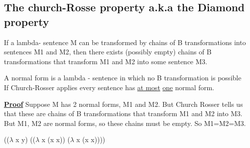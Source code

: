 \documentclass{article}
\begin{document}
\begin{flushleft}
\begin{flushleft}
\subsection*{The church-Rosse property a.k.a the Diamond property}
\begin{flushleft}
If a lambda- sentence M can be transformed by chains of B transformations into sentences M1 and M2, then there exists (possibly empty) chains of B transformations that transform M1 and M2 into some sentence M3.
\end{flushleft}
\begin{flushleft}
A normal form is a lambda - sentence in which no B transformation is possible \\
If Church-Rosser applies every sentence has \underline{at most} \underline{one} normal form.
\end{flushleft}
\begin{flushleft}
\textbf{\underline{Proof}} Suppose M has 2 normal forms, M1 and M2. But Church Rosser tells us that these are chains of B      transformations that transform M1 and M2 into M3. But M1, M2 are normal forms, so these chains must be empty. So M1=M2=M3.
\end{flushleft}
\begin{flushleft}
(($\lambda$ x y) (($\lambda$ x (x x)) ($\lambda$ x (x x))))
\end{flushleft}
\end{flushleft}
\end{flushleft}
\end{document}
